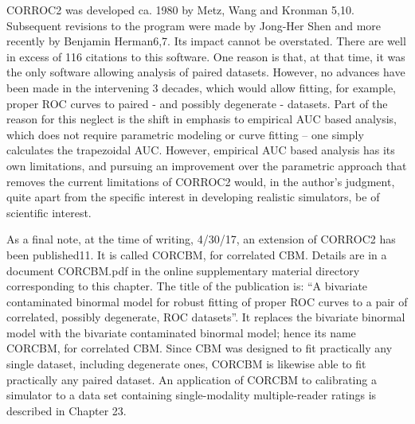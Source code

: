 \documentclass[
]{book}
\begin{document}
CORROC2 was developed ca. 1980 by Metz, Wang and Kronman 5,10. Subsequent revisions to the program were made by Jong-Her Shen and more recently by Benjamin Herman6,7. Its impact cannot be overstated. There are well in excess of 116 citations to this software. One reason is that, at that time, it was the only software allowing analysis of paired datasets. However, no advances have been made in the intervening 3 decades, which would allow fitting, for example, proper ROC curves to paired - and possibly degenerate - datasets. Part of the reason for this neglect is the shift in emphasis to empirical AUC based analysis, which does not require parametric modeling or curve fitting -- one simply calculates the trapezoidal AUC. However, empirical AUC based analysis has its own limitations, and pursuing an improvement over the parametric approach that removes the current limitations of CORROC2 would, in the author's judgment, quite apart from the specific interest in developing realistic simulators, be of scientific interest.

As a final note, at the time of writing, 4/30/17, an extension of CORROC2 has been published11. It is called CORCBM, for correlated CBM. Details are in a document CORCBM.pdf in the online supplementary material directory corresponding to this chapter. The title of the publication is: ``A bivariate contaminated binormal model for robust fitting of proper ROC curves to a pair of correlated, possibly degenerate, ROC datasets''. It replaces the bivariate binormal model with the bivariate contaminated binormal model; hence its name CORCBM, for correlated CBM. Since CBM was designed to fit practically any single dataset, including degenerate ones, CORCBM is likewise able to fit practically any paired dataset. An application of CORCBM to calibrating a simulator to a data set containing single-modality multiple-reader ratings is described in Chapter 23.

  
\end{document}
